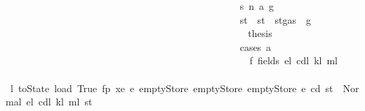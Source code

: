 \begin{isabellebody}
\ \ \ \ \ \ \ \ \ \ \ \ \ \ \ \ \ \ \ \ \ \ \ \ \ \ \ \ \ \ \ \ \ \ \ \ \ \ \ \ \ \ \ \ \ \ \isamarkupfalse%
\ s{}{\isacharcolon}{\kern0pt}\ {\isacharparenleft}{\kern0pt}n\ a\ g{\isacharprime}{\kern0pt}{\isacharprime}{\kern0pt}{\isacharprime}{\kern0pt}{\isacharparenright}{\kern0pt}\isanewline
\ \ \ \ \ \ \ \ \ \ \ \ \ \ \ \ \ \ \ \ \ \ \ \ \ \ \ \ \ \ \ \ \ \ \ \ \ \ \ \ \ \ \ \ \ \ \isamarkupfalse%
\ st{\isacharprime}{\kern0pt}{\isacharprime}{\kern0pt}{\isacharprime}{\kern0pt}{\isacharprime}{\kern0pt}\ \ {\isachardoublequoteopen}st{\isacharprime}{\kern0pt}{\isacharprime}{\kern0pt}{\isacharprime}{\kern0pt}{\isacharprime}{\kern0pt}\ {\isacharequal}{\kern0pt}\ st{\isacharprime}{\kern0pt}{\isacharprime}{\kern0pt}{\isacharprime}{\kern0pt}{\isasymlparr}gas\ {\isacharcolon}{\kern0pt}{\isacharequal}{\kern0pt}\ g{\isacharprime}{\kern0pt}{\isacharprime}{\kern0pt}{\isacharprime}{\kern0pt}{\isasymrparr}{\isachardoublequoteclose}\isanewline
\ \ \ \ \ \ \ \ \ \ \ \ \ \ \ \ \ \ \ \ \ \ \ \ \ \ \ \ \ \ \ \ \ \ \ \ \ \ \ \ \ \ \ \ \ \ \isamarkupfalse%
\ \isamarkupfalse%
\ {\isacharquery}{\kern0pt}thesis\isanewline
\ \ \ \ \ \ \ \ \ \ \ \ \ \ \ \ \ \ \ \ \ \ \ \ \ \ \ \ \ \ \ \ \ \ \ \ \ \ \ \ \ \ \ \ \ \ \isamarkupfalse%
\ {\isacharparenleft}{\kern0pt}cases\ a{\isacharparenright}{\kern0pt}\isanewline
\ \ \ \ \ \ \ \ \ \ \ \ \ \ \ \ \ \ \ \ \ \ \ \ \ \ \ \ \ \ \ \ \ \ \ \ \ \ \ \ \ \ \ \ \ \ \ \ \isamarkupfalse%
\ f{}{\isacharcolon}{\kern0pt}\ {\isacharparenleft}{\kern0pt}fields\ e\isactrlsub l\ cd\isactrlsub l\ k\isactrlsub l\ m\isactrlsub l{\isacharparenright}{\kern0pt}\isanewline
\ \ \ \ \ \ \ \ \ \ \ \ \ \ \ \ \ \ \ \ \ \ \ \ \ \ \ \ \ \ \ \ \ \ \ \ \ \ \ \ \ \ \ \ \ \ \ \ \isamarkupfalse%
\ \isamarkupfalse%
\ l{}{}{\isacharcolon}{\kern0pt}\ {\isachardoublequoteopen}toState\ {\isacharparenleft}{\kern0pt}load\ True\ fp\ xe\ e{\isacharprime}{\kern0pt}\ emptyStore\ emptyStore\ emptyStore\ e\ cd{\isacharparenright}{\kern0pt}\ st{\isacharprime}{\kern0pt}{\isacharprime}{\kern0pt}{\isacharprime}{\kern0pt}\ {\isacharequal}{\kern0pt}\ Normal\ {\isacharparenleft}{\kern0pt}{\isacharparenleft}{\kern0pt}e\isactrlsub l{\isacharcomma}{\kern0pt}\ cd\isactrlsub l{\isacharcomma}{\kern0pt}\ k\isactrlsub l{\isacharcomma}{\kern0pt}\ m\isactrlsub l{\isacharparenright}{\kern0pt}{\isacharcomma}{\kern0pt}\ st{\isacharprime}{\kern0pt}{\isacharprime}{\kern0pt}{\isacharprime}{\kern0pt}{\isacharprime}{\kern0pt}{\isacharparenright}{\kern0pt}{\isachardoublequoteclose}\ \isamarkupfalse%

\end{isabellebody}
